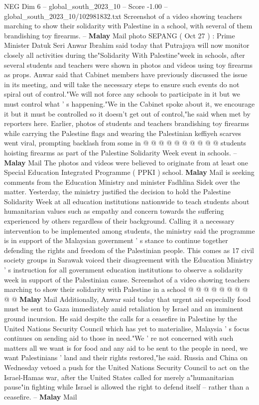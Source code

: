 \begin{textsample}{NEG Dim 6 – global\_south\_2023\_10 – Score -1.00 – global\_south\_2023\_10/102981832.txt}  \label{ex:f6_neg_208}
Screenshot of a video showing teachers marching to show their solidarity with Palestine in a school, with several of them brandishing toy firearms. -- \textbf{Malay} Mail photo SEPANG ( Oct 27 ) : Prime Minister Datuk Seri Anwar Ibrahim said today that Putrajaya will now monitor closely all activities during the"Solidarity With Palestine"week in schools, after several students and teachers were shown in photos and videos using toy firearms as props.
Anwar said that Cabinet members have previously discussed the issue in its meeting, and will take the necessary steps to ensure such events do not spiral out of control."We will not force any schools to participate in it but we must control what ' s happening."We in the Cabinet spoke about it, we encourage it but it must be controlled so it doesn't get out of control,"he said when met by reporters here.
Earlier, photos of students and teachers brandishing toy firearms while carrying the Palestine flags and wearing the Palestinian keffiyeh scarves went viral, prompting backlash from some in @ @ @ @ @ @ @ @ @ @ students hoisting firearms as part of the Palestine Solidarity Week event in schools. -- \textbf{Malay} Mail The photos and videos were believed to originate from at least one Special Education Integrated Programme ( PPKI ) school. \textbf{Malay} Mail is seeking comments from the Education Ministry and minister Fadhlina Sidek over the matter.
Yesterday, the ministry justified the decision to hold the Palestine Solidarity Week at all education institutions nationwide to teach students about humanitarian values such as empathy and concern towards the suffering experienced by others regardless of their background.
Calling it a necessary intervention to be implemented among students, the ministry said the programme is in support of the Malaysian government ' s stance to continue together defending the rights and freedom of the Palestinian people.
This comes as 17 civil society groups in Sarawak voiced their disagreement with the Education Ministry ' s instruction for all government education institutions to observe a solidarity week in support of the Palestinian cause.
Screenshot of a video showing teachers marching to show their solidarity with Palestine in a school @ @ @ @ @ @ @ @ @ @ \textbf{Malay} Mail Additionally, Anwar said today that urgent aid especially food must be sent to Gaza immediately amid retaliation by Israel and an imminent ground incursion.
He said despite the calls for a ceasefire in Palestine by the United Nations Security Council which has yet to materialise, Malaysia ' s focus continues on sending aid to those in need."We ' re not concerned with such matters all we want is for food and any aid to be sent to the people in need, we want Palestinians ' land and their rights restored,"he said.
Russia and China on Wednesday vetoed a push for the United Nations Security Council to act on the Israel-Hamas war, after the United States called for merely a"humanitarian pause"in fighting while Israel is allowed the right to defend itself -- rather than a ceasefire. -- \textbf{Malay} Mail

\end{textsample}
